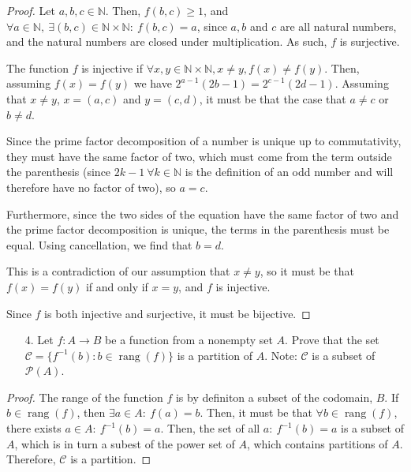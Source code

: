 \documentclass[10pt]{article}
\theoremstyle{definition}
\theoremstyle{plain}
\newcommand{\N}{\mathbb{N}}
\DeclareMathOperator\rang{rang}
\begin{document}
\begin{proof}
  Let $a,b,c\in\N$. Then, $f(b,c)\geq 1$, and $\forall a\in\N,\ \exists (b,c)\in\N\times\N:\ f(b,c)=a$, since $a,b$ and $c$ are all natural numbers, and the natural numbers are closed under multiplication. As such, $f$ is surjective.

  The function $f$ is injective if $\forall x,y\in\N\times\N, x\neq y, f(x)\neq f(y).$ Then, assuming $f(x)=f(y)$ we have $2^{a-1} (2b-1) = 2^{c-1} (2d-1).$ Assuming that $x\neq y$, $x=(a,c)$ and $y=(c,d)$, it must be that the case that $a\neq c$ or $b\neq d$.

  Since the prime factor decomposition of a number is unique up to commutativity, they must have the same factor of two, which must come from the term outside the parenthesis (since $2k-1 \ \forall k\in\N$ is the definition of an odd number and will therefore have no factor of two), so $a=c$.

  Furthermore, since the two sides of the equation have the same factor of two and the prime factor decomposition is unique, the terms in the parenthesis must be equal. Using cancellation, we find that $b=d$.

  This is a contradiction of our assumption that $x\neq y$, so it must be that $f(x)=f(y)$ if and only if $x=y$, and $f$ is injective.

  Since $f$ is both injective and surjective, it must be bijective.
\end{proof}



\pagebreak



\begin{enumerate}
\item[4.] Let $f:A \to B$ be a function from a nonempty set $A$.  Prove that the set $ \mathcal{C} = \{f^{-1}(b): b \in \rang(f)\}$ is a partition of $A$.  Note:  $\mathcal{C}$ is a subset of $\mathscr{P}(A)$.
\end{enumerate}



\begin{proof}
  The range of the function $f$ is by definiton a subset of the codomain, $B$. If $b\in\rang(f)$, then $\exists a\in A:\ f(a) = b$. Then, it must be that $\forall b\in\rang(f)$, there exists $a\in A:\ f^{-1}(b) = a$. Then, the set of all $a:\ f^{-1}(b) = a$ is a subset of $A$, which is in turn a subest of the power set of $A$, which contains partitions of $A$. Therefore, $\mathcal{C}$ is a partition.
\end{proof}
\end{document}
